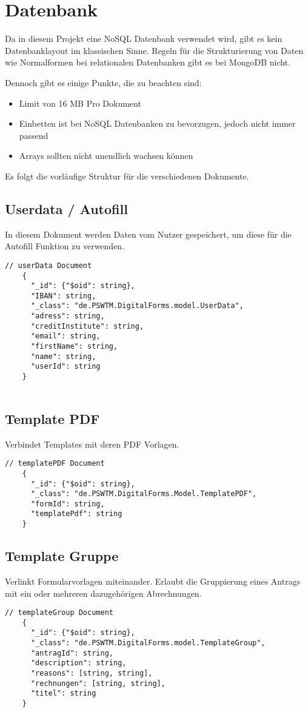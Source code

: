 \chapter{Datenbank}
Da in diesem Projekt eine NoSQL Datenbank verwendet wird, gibt es kein Datenbanklayout im klassischen Sinne.
Regeln für die Strukturierung von Daten wie Normalformen bei relationalen Datenbanken gibt es bei MongoDB nicht.

Dennoch gibt es einige Punkte, die zu beachten sind:
\begin{itemize}
    \item Limit von 16 \ac{MB} Pro Dokument
    \item Einbetten ist bei NoSQL Datenbanken zu bevorzugen, jedoch nicht immer passend
    \item Arrays sollten nicht unendlich wachsen können
\end{itemize}

Es folgt die vorläufige Struktur für die verschiedenen Dokumente.

\section{Userdata / Autofill}
In diesem Dokument werden Daten vom Nutzer gespeichert, um diese für die Autofill Funktion zu verwenden.
\begin{lstlisting}[label={lst:lstlistingusers}]
    // userData Document
    {
      "_id": {"$oid": string},
      "IBAN": string,
      "_class": "de.PSWTM.DigitalForms.model.UserData",
      "adress": string,
      "creditInstitute": string,
      "email": string,
      "firstName": string,
      "name": string,
      "userId": string
    }


\end{lstlisting}

\section{Template \ac{PDF}}
Verbindet Templates mit deren \ac{PDF} Vorlagen.
\begin{lstlisting}[label={lst:lstlistingauto}]
    // templatePDF Document
    {
      "_id": {"$oid": string},
      "_class": "de.PSWTM.DigitalForms.Model.TemplatePDF",
      "formId": string,
      "templatePdf": string
    }

\end{lstlisting}

\section{Template Gruppe}
Verlinkt Formularvorlagen miteinander.
Erlaubt die Gruppierung eines Antrags mit ein oder mehreren dazugehörigen Abrechnungen.
\begin{lstlisting}[label={lst:templateGroup}]
    // templateGroup Document
    {
      "_id": {"$oid": string},
      "_class": "de.PSWTM.DigitalForms.model.TemplateGroup",
      "antragId": string,
      "description": string,
      "reasons": [string, string],
      "rechnungen": [string, string],
      "titel": string
    }

\end{lstlisting}


